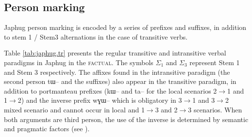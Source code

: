 \documentclass[oldfontcommands,oneside,a4paper,11pt]{article}
\newcommand{\ipa}[1]{{\phon #1}} %
\newcommand{\siga}{$\Sigma_1$}
\newcommand{\sigc}{$\Sigma_3$}
\begin{document}
\subsection{Person marking}
Japhug person marking is encoded by a series of prefixes and suffixes, in addition to stem 1 / Stem3 alternations in the case of transitive verbs.

Table \ref{tab:japhug.tr} presents the regular transitive and intransitive verbal paradigms in Japhug in the \textsc{factual}. The symbols \siga{} and \sigc{} represent Stem 1 and Stem 3 respectively. The affixes found in the intransitive paradigm (the second person \ipa{tɯ--} and the suffixes) also appear in the transitive paradigm, in addition to portmanteau prefixes (\ipa{kɯ--} and \ipa{ta--} for the local scenarios 2$\rightarrow$1 and 1$\rightarrow$2) and the inverse prefix \ipa{wɣɯ--} which is obligatory in 3$\rightarrow$1 and 3$\rightarrow$2 mixed scenario and cannot occur in local and 1$\rightarrow$3 and 2$\rightarrow$3 scenarios. When both arguments are third person, the use of the inverse is determined by semantic and pragmatic factors (see \citealt{jacques10inverse}).
\end{document}
